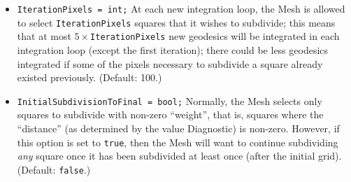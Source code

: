 \documentclass[11pt,a4paper]{article}
\newcommand{\code}[1]{{\tt #1}}
\begin{document}
\begin{itemize}
\begin{itemize}
 Note that, when \code{InitialPixels = $n^2$} and \code{MaxSubdivide = $d$}, the total square grid size of pixels will then be given by $((n-1)\cdot 2^{d-1}+1)^2$.

 \item \code{IterationPixels = int;}\newline
 At each new integration loop, the Mesh is allowed to select \code{IterationPixels} squares that it wishes to subdivide; this means that at most $5\times$\code{IterationPixels} new geodesics will be integrated in each integration loop (except the first iteration); there could be less geodesics integrated if some of the pixels necessary to subdivide a square already existed previously. (Default: 100.)
 \item \code{InitialSubdivisionToFinal = bool;} \newline
 Normally, the Mesh selects only squares to subdivide with non-zero ``weight'', that is, squares where the ``distance'' (as determined by the value Diagnostic) is non-zero. However, if this option is set to \code{true}, then the Mesh will want to continue subdividing \emph{any} square once it has been subdivided at least once (after the initial grid). (Default: \code{false}.)
\end{itemize}
\end{itemize}
\end{document}
